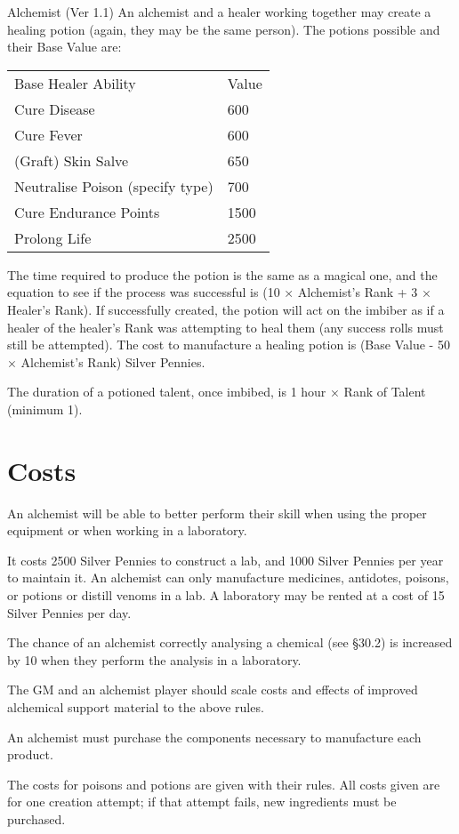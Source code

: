 \begin{Chapter}{Alchemist (Ver 1.1)}
An alchemist and a healer working together may create a healing potion
(again, they may be the same person).  The potions possible and their
Base Value are:

\begin{tabularx}{\columnwidth}{Xl}
Base Healer Ability			& Value  \\
Cure Disease				& 600 \\
Cure Fever				& 600 \\
(Graft) Skin Salve			& 650 \\
Neutralise Poison (specify type)	& 700 \\
Cure Endurance Points			& 1500 \\ 
Prolong Life				& 2500 \\
\end{tabularx}

The time required to produce the potion is the same as a magical one,
and the equation to see if the process was successful is (10 ×
Alchemist’s Rank + 3 × Healer’s Rank).  If successfully created, the
potion will act on the imbiber as if a healer of the healer’s Rank was
attempting to heal them (any success rolls must still be attempted).
The cost to manufacture a healing potion is (Base Value - 50 ×
Alchemist’s Rank) Silver Pennies.

The duration of a potioned talent, once imbibed, is 1 hour × Rank of
Talent (minimum 1).

\section{Costs}

An alchemist will be able to better perform their skill when using the
proper equipment or when working in a laboratory.

It costs 2500 Silver Pennies to construct a lab, and 1000 Silver
Pennies per year to maintain it.  An alchemist can only manufacture
medicines, antidotes, poisons, or potions or distill venoms in a lab.
A laboratory may be rented at a cost of 15 Silver Pennies per day.

The chance of an alchemist correctly analysing a chemical (see §30.2)
is increased by 10 when they perform the analysis in a laboratory.

The GM and an alchemist player should scale costs and effects of
improved alchemical support material to the above rules.

An alchemist must purchase the components necessary to manufacture
each product.

The costs for poisons and potions are given with their rules.  All
costs given are for one creation attempt; if that attempt fails, new
ingredients must be purchased.

\end{Chapter}
